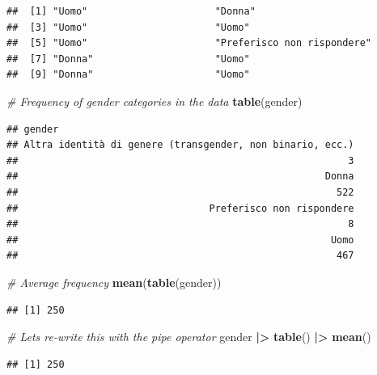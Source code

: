 \documentclass[
]{book}
\newenvironment{Shaded}{\begin{snugshade}}{\end{snugshade}}
\newcommand{\CommentTok}[1]{\textcolor[rgb]{0.56,0.35,0.01}{\textit{#1}}}
\newcommand{\FunctionTok}[1]{\textcolor[rgb]{0.13,0.29,0.53}{\textbf{#1}}}
\newcommand{\NormalTok}[1]{#1}
\newcommand{\SpecialCharTok}[1]{\textcolor[rgb]{0.81,0.36,0.00}{\textbf{#1}}}
\begin{document}
\begin{verbatim}
##  [1] "Uomo"                      "Donna"                    
##  [3] "Uomo"                      "Uomo"                     
##  [5] "Uomo"                      "Preferisco non rispondere"
##  [7] "Donna"                     "Uomo"                     
##  [9] "Donna"                     "Uomo"
\end{verbatim}

\begin{Shaded}
\begin{Highlighting}[]
\CommentTok{\# Frequency of gender categories in the data}
\FunctionTok{table}\NormalTok{(gender)}
\end{Highlighting}
\end{Shaded}

\begin{verbatim}
## gender
## Altra identità di genere (transgender, non binario, ecc.) 
##                                                         3 
##                                                     Donna 
##                                                       522 
##                                 Preferisco non rispondere 
##                                                         8 
##                                                      Uomo 
##                                                       467
\end{verbatim}

\begin{Shaded}
\begin{Highlighting}[]
\CommentTok{\# Average frequency}
\FunctionTok{mean}\NormalTok{(}\FunctionTok{table}\NormalTok{(gender))}
\end{Highlighting}
\end{Shaded}

\begin{verbatim}
## [1] 250
\end{verbatim}

\begin{Shaded}
\begin{Highlighting}[]
\CommentTok{\# Let\textquotesingle{}s re{-}write this with the pipe operator}
\NormalTok{gender }\SpecialCharTok{|\textgreater{}} 
  \FunctionTok{table}\NormalTok{() }\SpecialCharTok{|\textgreater{}} 
  \FunctionTok{mean}\NormalTok{()}
\end{Highlighting}
\end{Shaded}

\begin{verbatim}
## [1] 250
\end{verbatim}
\end{document}
